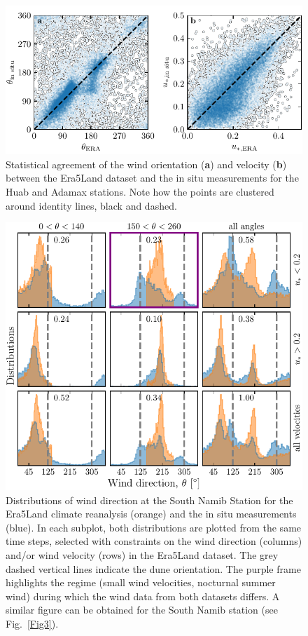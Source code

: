 \begin{figure}
  \centering
  \includegraphics[scale=1]{Figures/Figure5_supp.pdf}
  \caption{Statistical agreement of the wind orientation (\textbf{a}) and velocity (\textbf{b}) between the Era5Land dataset and the in situ measurements for the Huab and Adamax stations. Note how the points are clustered around identity lines, black and dashed.}
  \label{Fig5_supp}
\end{figure}

\begin{figure}
  \centering
  \includegraphics[scale=1]{Figures/Figure6_supp.pdf}
  \caption{Distributions of wind direction at the South Namib Station for the Era5Land climate reanalysis (orange) and the in situ measurements (blue). In each subplot, both distributions are plotted from the same time steps, selected with constraints on the wind direction (columns) and/or wind velocity (rows) in the Era5Land dataset. The grey dashed vertical lines indicate the dune orientation. The purple frame highlights the regime (small wind velocities, nocturnal summer wind) during which the wind data from both datasets differs. A similar figure can be obtained for the South Namib station (see Fig.~\ref{Fig3}).}
  \label{Fig6_supp}
\end{figure}

